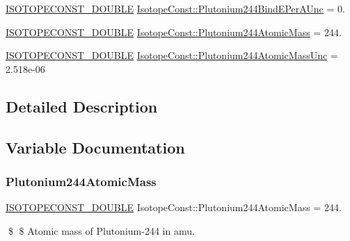 \begin{DoxyCompactItemize}
\mbox{\hyperlink{group___isotope_const-_macros_ga8f45a7272ce02c0b4c65c44636ed719a}{I\+S\+O\+T\+O\+P\+E\+C\+O\+N\+S\+T\+\_\+\+D\+O\+U\+B\+LE}} \mbox{\hyperlink{group___isotope_const-_plutonium-_pu244_ga389186292ba17a4aff4c786432c0d9f5}{Isotope\+Const\+::\+Plutonium244\+Bind\+E\+Per\+A\+Unc}} = 0.
\item 
\mbox{\hyperlink{group___isotope_const-_macros_ga8f45a7272ce02c0b4c65c44636ed719a}{I\+S\+O\+T\+O\+P\+E\+C\+O\+N\+S\+T\+\_\+\+D\+O\+U\+B\+LE}} \mbox{\hyperlink{group___isotope_const-_plutonium-_pu244_ga292ba69f8681a4a787d729b712368027}{Isotope\+Const\+::\+Plutonium244\+Atomic\+Mass}} = 244.
\item 
\mbox{\hyperlink{group___isotope_const-_macros_ga8f45a7272ce02c0b4c65c44636ed719a}{I\+S\+O\+T\+O\+P\+E\+C\+O\+N\+S\+T\+\_\+\+D\+O\+U\+B\+LE}} \mbox{\hyperlink{group___isotope_const-_plutonium-_pu244_ga3c6304dd3d570eed39f12c0337d2f00c}{Isotope\+Const\+::\+Plutonium244\+Atomic\+Mass\+Unc}} = 2.\+518e-\/06
\end{DoxyCompactItemize}


\subsection{Detailed Description}


\subsection{Variable Documentation}
\mbox{\label{group___isotope_const-_plutonium-_pu244_ga292ba69f8681a4a787d729b712368027}} 
\subsubsection{\texorpdfstring{Plutonium244\+Atomic\+Mass}{Plutonium244AtomicMass}}
{\footnotesize\ttfamily \mbox{\hyperlink{group___isotope_const-_macros_ga8f45a7272ce02c0b4c65c44636ed719a}{I\+S\+O\+T\+O\+P\+E\+C\+O\+N\+S\+T\+\_\+\+D\+O\+U\+B\+LE}} Isotope\+Const\+::\+Plutonium244\+Atomic\+Mass = 244.}

\$ \$ Atomic mass of Plutonium-\/244 in amu. \mbox{\label{group___isotope_const-_plutonium-_pu244_ga3c6304dd3d570eed39f12c0337d2f00c}} 
